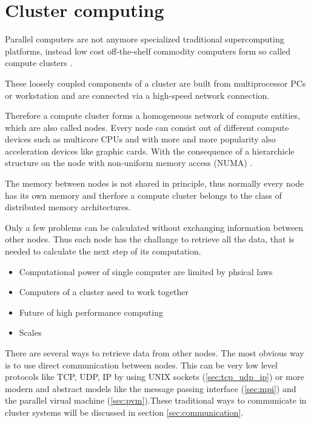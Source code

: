 \section{Cluster computing}
Parallel computers are not anymore specialized traditional
supercomputing platforms, instead low cost off-the-shelf commodity
computers form so called compute clusters \cite{ref:hpcc1}.

These loosely coupled components of a cluster are built from
multiprocessor PCs or workstation and are connected via a high-speed
network connection.

Therefore a compute cluster forms a homogeneous network of compute
entities, which are also called nodes. Every node can consist out of
different compute devices such as multicore CPUs and with more and
more popularity also acceleration devices like graphic cards. With the
consequence of a hierarchicle structure on the node with non-uniform
memory access (NUMA) \cite[numa]{ref:numa}.

The memory between nodes is not shared in principle, thus normally
every node has its own memory and therfore a compute cluster belongs
to the class of distributed memory architectures.

Only a few problems can be calculated without exchanging information
between other nodes. Thus each node has the challange to retrieve all
the data, that is needed to calculate the next step of its
computation.

\begin{itemize}
\item Computational power of single computer are limited by 
  phsical laws
\item Computers of a cluster need to work together
\item Future of high performance computing \cite{ref:hpc}
\item Scales
\end{itemize}

There are several ways to retrieve data from other nodes. The most
obvious way is to use direct communication between nodes. This
can be very low level protocols like TCP, UDP, IP by using UNIX sockets (\ref{sec:tcp_udp_ip}) or more modern and abstract models like the message passing interface (\ref{sec:mpi}) and the parallel virual machine (\ref{sec:pvm}).These traditional ways to communicate in 
cluster systems  will be discussed in section \ref{sec:communication}.

